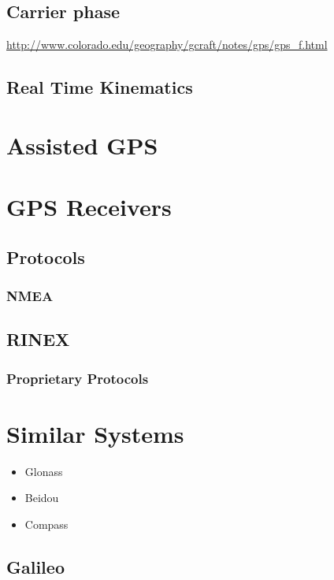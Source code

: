 \subsection{Carrier phase}
\url{http://www.colorado.edu/geography/gcraft/notes/gps/gps_f.html}

\subsection{Real Time Kinematics}

\section{Assisted GPS}


\section{GPS Receivers}
\subsection{Protocols}
\subsubsection{NMEA}
\subsection{RINEX}
\subsubsection{Proprietary Protocols}

\section{Similar Systems}

\begin{itemize}
\item Glonass
\item Beidou
\item Compass
\end{itemize}

\subsection{Galileo}
\label{sec:galileo}
